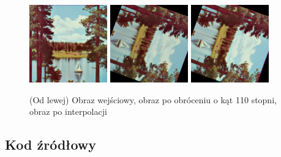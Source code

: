 \documentclass[final,a4paper,openany,12pt]{mwbk}
\begin{document}
\begin{figure}[H]
	\begin{center}
		\includegraphics[width=0.3\textwidth]{2/2Geo_Turn_Original}
		\includegraphics[width=0.3\textwidth]{2/2Geo_Turn_Result}
		\includegraphics[width=0.3\textwidth]{2/2Geo_Turn_Result_Interp}
	\end{center}
	\caption{(Od lewej) Obraz wejściowy, obraz po obróceniu o kąt 110 stopni, obraz po interpolacji }
\end{figure}


\subsection*{Kod źródłowy}
\end{document}
